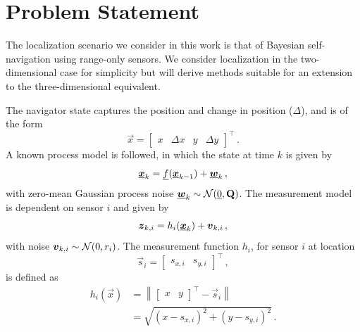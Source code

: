 \documentclass[10pt,letterpaper,oneside,twocolumn,journal]{IEEEtran}
\theoremstyle{definition}
\theoremstyle{definition}
\theoremstyle{remark}
\begin{document}
\section{Problem Statement} \label{sec:problem_statement}
The localization scenario we consider in this work is that of Bayesian self-navigation using range-only sensors. We consider localization in the two-dimensional case for simplicity but will derive methods suitable for an extension to the three-dimensional equivalent.

The navigator state captures the position and change in position ($\Delta$), and is of the form 
\begin{equation}
    \vec{x} = 
    \begin{bmatrix}
        x & \Delta x & y & \Delta y
    \end{bmatrix}^\top\,. \label{eqn:state_def}
\end{equation}
A known process model is followed, in which the state at time $k$ is given by
\begin{equation}
    \rvec{x}_k = \vec{f}(\rvec{x}_{k-1})+\rvec{w}_k\,, \label{eqn:process_model}
\end{equation}
with zero-mean Gaussian process noise ${\boldsymbol{\underline{w}}}_k \sim \mathcal{N}({\underline{0}},{{\mathbf{Q}}})$. The measurement model is dependent on sensor $i$ and given by
\begin{equation}
    \rv{z}_{k,i} = h_i(\rvec{x}_k)+\rv{v}_{k,i}\,, \label{eqn:measurement_model}
\end{equation}
with noise ${\boldsymbol{v}}_{k,i} \sim \mathcal{N}(0,r_i)$. The measurement function $h_i$, for sensor $i$ at location
\begin{equation}
    \vec{s}_i = 
    \begin{bmatrix}
        s_{x,i} & s_{y,i}
    \end{bmatrix}^\top\,,
\end{equation} 
is defined as
\begin{equation}
    \begin{split}
        h_i(\vec{x}) &= \left\lVert
        \begin{bmatrix}
            x & y
        \end{bmatrix}^\top
        - \vec{s}_{i}\right\rVert \\
        &= \sqrt{(x-s_{x,i})^2 + (y-s_{y,i})^2}\,.
    \end{split}
\end{equation}
\end{document}
